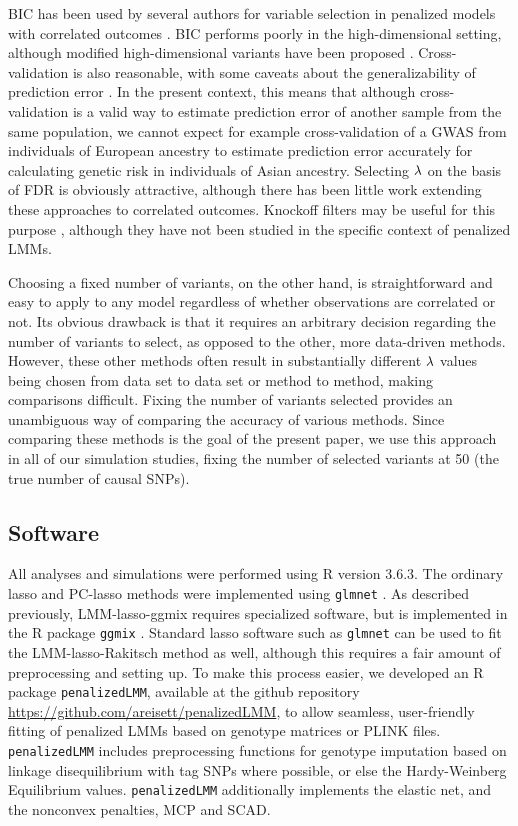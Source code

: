 BIC has been used by several authors for variable selection in penalized models with correlated outcomes \citep{bondell2010joint, schelldorfer2011estimation}. BIC performs poorly in the high-dimensional setting, although modified high-dimensional variants have been proposed \citep{fan2013tuning, Chen2008a}. Cross-validation is also reasonable, with some caveats about the generalizability of prediction error \citep{Rabinowicz2020}. In the present context, this means that although cross-validation is a valid way to estimate prediction error of another sample from the same population, we cannot expect for example cross-validation of a GWAS from individuals of European ancestry to estimate prediction error accurately for calculating genetic risk in individuals of Asian ancestry.  Selecting $\lambda$ on the basis of FDR is obviously attractive, although there has been little work extending these approaches to correlated outcomes.  Knockoff filters may be useful for this purpose \citep{Sesia2018}, although they have not been studied in the specific context of penalized LMMs.

Choosing a fixed number of variants, on the other hand, is straightforward and easy to apply to any model regardless of whether observations are correlated or not.  Its obvious drawback is that it requires an arbitrary decision regarding the number of variants to select, as opposed to the other, more data-driven methods.  However, these other methods often result in substantially different $\lambda$ values being chosen from data set to data set or method to method, making comparisons difficult.  Fixing the number of variants selected provides an unambiguous way of comparing the accuracy of various methods.  Since comparing these methods is the goal of the present paper, we use this approach in all of our simulation studies, fixing the number of selected variants at 50 (the true number of causal SNPs).

\subsection{Software}
\label{sec:software}

All analyses and simulations were performed using R version 3.6.3. The ordinary lasso and PC-lasso methods were implemented using \texttt{glmnet} \citep{glmnet}. As described previously, LMM-lasso-ggmix requires specialized software, but is implemented in the R package \texttt{ggmix} \citep{bhatnagar2020simultaneous}. Standard lasso software such as \texttt{glmnet} can be used to fit the LMM-lasso-Rakitsch method as well, although this requires a fair amount of preprocessing and setting up. To make this process easier, we developed an R package \texttt{penalizedLMM}, available at the github repository \url{https://github.com/areisett/penalizedLMM}, to allow seamless, user-friendly fitting of penalized LMMs based on genotype matrices or PLINK files. \texttt{penalizedLMM} includes preprocessing functions for genotype imputation based on linkage disequilibrium with tag SNPs where possible, or else the Hardy-Weinberg Equilibrium values. \texttt{penalizedLMM} additionally implements the elastic net, and the nonconvex penalties, MCP and SCAD. 

